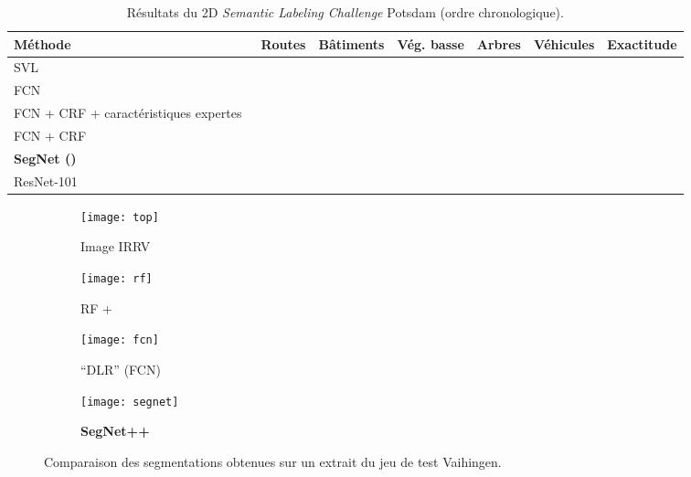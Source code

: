 \begin{table}[t]
    \caption{Résultats du  2D \emph{Semantic Labeling Challenge} Potsdam (ordre chronologique).}
    \label{table:final_potsdam}
    \setlength\tabcolsep{4pt}
	\begin{tabularx}{\textwidth}{Y c c c c c c}
    \toprule
	Méthode & Routes & Bâtiments & Vég. basse & Arbres & Véhicules & Exactitude\\
    \midrule
		SVL~\cite{gerke_use_2015} &  &	 &	 &	 &	 &	\\
		FCN~\cite{sherrah_fully_2016} &  &  &  &  &  & \\
    FCN + CRF + caractéristiques expertes~\cite{liu_dense_2017} &  &  &  &  &  & \\
		FCN + CRF~\cite{volpi_dense_2017} & 	&  &  &  &  & \\
    \midrule
    \textbf{SegNet ()} &  &  &  &  &  & \\
		\midrule
		ResNet-101~\cite{liu_semantic_2017} &  &	 &	 &	 &	 &	\\
    \bottomrule
    \end{tabularx}
\end{table}

\begin{figure}[h]
  \begin{subfigure}[t]{0.25\textwidth}
    \texttt{[image: top]}
    \caption{Image \gls{IRRV}}
  \end{subfigure}%
  \begin{subfigure}[t]{0.25\textwidth}
    \texttt{[image: rf]}
    \caption{RF + ~\cite{quang_efficient_2015}}
  \end{subfigure}%
  \begin{subfigure}[t]{0.25\textwidth}
    \texttt{[image: fcn]}
    \caption{``DLR'' (\gls{FCN})~\cite{marmanis_semantic_2016}}
  \end{subfigure}%
    \begin{subfigure}[t]{0.25\textwidth}
    \texttt{[image: segnet]}
    \caption{\textbf{SegNet++}}
  \end{subfigure}
  \caption[Comparaison des segmentations obtenues sur un extrait du jeu de test  Vaihingen.]{Comparaison des segmentations obtenues sur un extrait du jeu de test  Vaihingen.\\
  \isprslegende}
  \label{fig_segnet_qualitative}
\end{figure}


